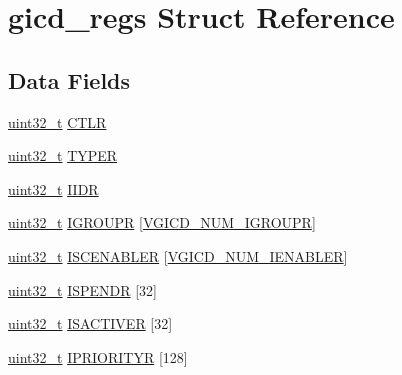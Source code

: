 \hypertarget{structgicd__regs}{\section{gicd\-\_\-regs \-Struct \-Reference}
\label{structgicd__regs}
}
\subsection*{\-Data \-Fields}
\begin{DoxyCompactItemize}
\item 
\hyperlink{arch__types_8h_a435d1572bf3f880d55459d9805097f62}{uint32\-\_\-t} \hyperlink{structgicd__regs_a97a0909f6972748201f6f98fe22122a8}{\-C\-T\-L\-R}
\item 
\hyperlink{arch__types_8h_a435d1572bf3f880d55459d9805097f62}{uint32\-\_\-t} \hyperlink{structgicd__regs_add1b2ee4539697cfcd41ac08d60dc781}{\-T\-Y\-P\-E\-R}
\item 
\hyperlink{arch__types_8h_a435d1572bf3f880d55459d9805097f62}{uint32\-\_\-t} \hyperlink{structgicd__regs_a037d1b98fd054c88ca110e12d406dba7}{\-I\-I\-D\-R}
\item 
\hyperlink{arch__types_8h_a435d1572bf3f880d55459d9805097f62}{uint32\-\_\-t} \hyperlink{structgicd__regs_aa0ebbe1fac9ce77096bd5d05bb31aa4a}{\-I\-G\-R\-O\-U\-P\-R} \mbox{[}\hyperlink{vdev__gicd_8c_a42979379639a7d5140a52d3e31b42a65}{\-V\-G\-I\-C\-D\-\_\-\-N\-U\-M\-\_\-\-I\-G\-R\-O\-U\-P\-R}\mbox{]}
\item 
\hyperlink{arch__types_8h_a435d1572bf3f880d55459d9805097f62}{uint32\-\_\-t} \hyperlink{structgicd__regs_a0ab785c5a7595bf615bd278bac31f707}{\-I\-S\-C\-E\-N\-A\-B\-L\-E\-R} \mbox{[}\hyperlink{vdev__gicd_8c_a8038057967cc824ffecd9dacca6ff322}{\-V\-G\-I\-C\-D\-\_\-\-N\-U\-M\-\_\-\-I\-E\-N\-A\-B\-L\-E\-R}\mbox{]}
\item 
\hyperlink{arch__types_8h_a435d1572bf3f880d55459d9805097f62}{uint32\-\_\-t} \hyperlink{structgicd__regs_a9033d910fcf42a540e7b8428b310a7e8}{\-I\-S\-P\-E\-N\-D\-R} \mbox{[}32\mbox{]}
\item 
\hyperlink{arch__types_8h_a435d1572bf3f880d55459d9805097f62}{uint32\-\_\-t} \hyperlink{structgicd__regs_ad809bb8e51b288887c0fed376ebe0a0e}{\-I\-S\-A\-C\-T\-I\-V\-E\-R} \mbox{[}32\mbox{]}
\item 
\hyperlink{arch__types_8h_a435d1572bf3f880d55459d9805097f62}{uint32\-\_\-t} \hyperlink{structgicd__regs_a83e872a975dee8c1feb8665d21f9307e}{\-I\-P\-R\-I\-O\-R\-I\-T\-Y\-R} \mbox{[}128\mbox{]}
\item 

\end{DoxyCompactItemize}
